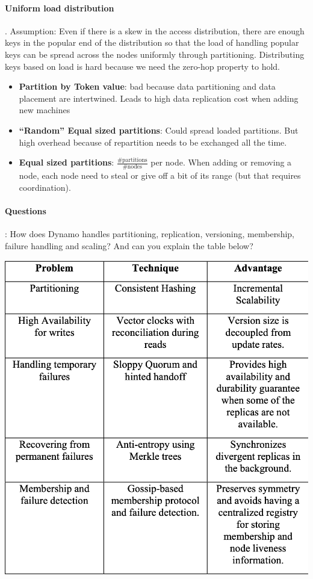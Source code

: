 \paragraph{Uniform load distribution}. Assumption: Even if there is a skew in
the access distribution, there are enough keys in the popular end of the
distribution so that the load of handling popular keys can be spread across the
nodes uniformly through partitioning. Distributing keys based on load is hard
because we need the zero-hop property to hold.
\begin{itemize}
  \item \textbf{Partition by Token value}: bad because data partitioning and
    data placement are intertwined. Leads to high data replication cost when
    adding new machines
  \item \textbf{``Random'' Equal sized partitions}: Could spread loaded
    partitions. But high overhead because of repartition needs to be exchanged
    all the time.
  \item \textbf{Equal sized partitions}: $\frac{\textrm{\#partitions}}{\textrm{\#nodes}}$ per
      node. When adding or removing a node, each node need to steal or give off
      a bit of its range (but that requires coordination).
\end{itemize}

\newpage
\paragraph{Questions}: How does Dynamo handles partitioning, replication,
versioning, membership, failure handling and scaling? And can you explain the
table below?

\includegraphics[width=0.45\linewidth]{img/dyn-tech.png}
